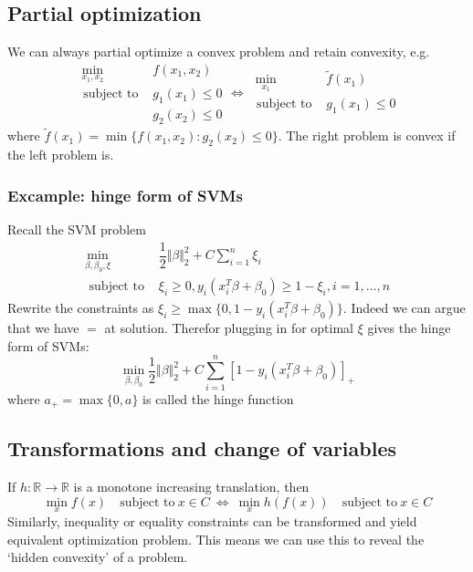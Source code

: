 \documentclass[a4paper]{article}
\begin{document}
{\subsection{Partial optimization}
We can always partial optimize a convex problem and retain convexity, e.g.
\begin{equation}
  \begin{array}{ll}
    \ \min\limits_{x_{1}, x_{2}} & f\left(x_{1}, x_{2}\right) \\
    \text{ subject to } & g_{1}\left(x_{1}\right) \leq 0 \\
    & g_{2}\left(x_{2}\right) \leq 0
  \end{array}
  \Longleftrightarrow 
  \begin{array}{ll}
    \ \min\limits_{x_{1}} & \tilde{f}\left(x_{1}\right) \\
    \text { subject to } & g_{1}\left(x_{1}\right) \leq 0 \nonumber \\
    {} & {}
  \end{array}
\end{equation}
where $\tilde{f}\left(x_{1}\right) = \min\{ f(x_1, x_2) : g_2(x_2) \leq 0\}$. The right problem is convex if the left problem is.

\subsubsection{Excample: hinge form of SVMs}
Recall the SVM problem
\begin{equation}
  \begin{array}{ll}
    \min\limits_{\beta, \beta_{0}, \xi} & \dfrac{1}{2}\Vert\beta\Vert_{2}^{2}+C \sum\limits_{i=1}^{n} \xi_{i} \\\text { subject to } & \xi_{i} \geq 0, y_{i}\left(x_{i}^{T} \beta+\beta_{0}\right) \geq 1-\xi_{i}, i=1, \ldots, n \nonumber
  \end{array}
\end{equation}
Rewrite the constraints as $\xi_i \geq \max\{0, 1 - y_{i}\left(x_{i}^{T} \beta+\beta_{0}\right)\}$. Indeed we can argue that we have $=$ at solution. Therefor plugging in for optimal $\xi$ gives the hinge form of SVMs:
\begin{equation}
  \min\limits_{\beta, \beta_{0}}\dfrac{1}{2}\Vert\beta\Vert_{2}^{2}+C \sum\limits_{i=1}^{n} [ 1 - y_{i}\left(x_{i}^{T} \beta+\beta_{0}\right) ]_+ \nonumber
\end{equation}
where $a_+ = \max \{0, a\}$ is called the hinge function

\subsection{Transformations and change of variables}
If $h : \mathbb{R} \rightarrow \mathbb{R}$ is a monotone increasing translation, then
\begin{equation}
  \min_x f(x) \quad \text{subject to} \ x \in C \ \Longleftrightarrow \ \min_x h(f(x)) \quad \text{subject to} \ x \in C \nonumber
\end{equation}
Similarly, inequality or equality constraints can be transformed and yield equivalent optimization problem. This means we can use this to reveal the `hidden convexity' of a problem.

}
\end{document}
